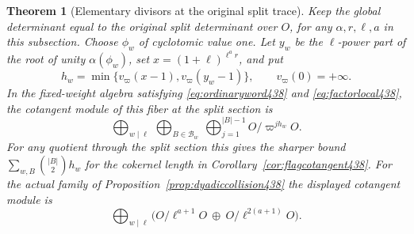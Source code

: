 \documentclass[a4paper,11pt]{article}
\newtheorem{theorem}[proposition]{Theorem}
\theoremstyle{definition}
\theoremstyle{remark}
\numberwithin{equation}{section}
\begin{document}
\begin{theorem}[Elementary divisors at the original split trace]\leavevmode
\label{thm:smithlabels438}
Keep the global determinant equal to the original split
determinant over \(O\), for any \(\alpha,r,\ell,a\) in this
subsection. Choose \(\phi_w\) of cyclotomic value one. Let
\(y_w\) be the \(\ell\)-power part of the root of unity
\(\alpha(\phi_w)\), set \(x=(1+\ell)^{\ell^a r}\), and put
\[
   h_w=\min\{v_\varpi(x-1),v_\varpi(y_w-1)\},
        \qquad v_\varpi(0)=+\infty .
\]
In the fixed-weight algebra satisfying
\eqref{eq:ordinaryword438} and \eqref{eq:factorlocal438},
the cotangent module of this fiber at the split section is
\[
     \bigoplus_{w\mid\ell}\ \bigoplus_{B\in\mathcal B_w}\
             \bigoplus_{j=1}^{|B|-1} O/\varpi^{j h_w}O .
\]
For any quotient through the split section this gives the
sharper bound \(\sum_{w,B}\binom{|B|}{2}h_w\) for the
cokernel length in Corollary~\ref{cor:flagcotangent438}.
For the actual family of
Proposition~\ref{prop:dyadiccollision438} the displayed
cotangent module is
\[
             \bigoplus_{w\mid\ell}
               \bigl(O/\ell^{a+1}O\ \oplus\
                     O/\ell^{2(a+1)}O\bigr).
\]
\end{theorem}
\end{document}
